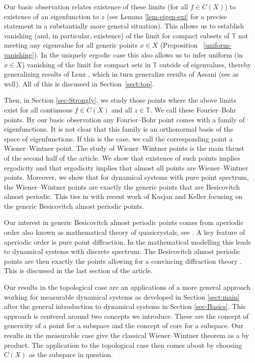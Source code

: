 \documentclass [14pt]{amsart}
\numberwithin{equation}{section}
\newcommand{\TT}{\mathbb T}
\begin{document}
Our basic observation relates existence of these limits (for all $f\in
C(X)$)  to existence of an eigenfunction to $z$ (see Lemma
\ref{lem-eigen-exi} for a precise statement in a substantially more
general situation). This allows us to establish vanishing (and, in
particular,  existence) of the limit for compact subsets of $\TT$ not
meeting any eigenvalue for all generic points $x\in X$ (Proposition~
\ref{uniform-vanishing}). In the uniquely ergodic case this  also
allows us to infer uniform (in $x\in X$) vanishing of the limit for
compact sets in $\TT$ outside of eigenvalues, thereby generalizing
results of Lenz \cite{Len}, which in turn generalize results of Assani
\cite{Ass} (see  \cite{Rob,Sch} as well). All of this is
discussed in Section~\ref{sect:top}.

Then, in Section \ref{sec-Strongly}, we study those points
where the above limits exist for all continuous $f \in C(X)$ and all $z\in
\TT$. We call these Fourier--Bohr points. By our basic observation any
Fourier--Bohr point comes with a family of eigenfunctions. It is not
clear that this family is an orthonormal basis of the space of
eigenfunctions. If this is the case, we call the corresponding point a
Wiener--Wintner point. The study of Wiener--Wintner points is the main
thrust of the second half of the article. We show that existence of
such points implies ergodicity and that ergodicity implies that almost
all points are Wiener--Wintner points. Moreover, we show that for dynamical systems with pure
point spectrum, the
Wiener--Wintner points are exactly the generic points that are Besicovitch almost
periodic. This ties in with recent work of Kasjan and Keller
\cite{KK} focusing on the generic Besicovitch almost periodic points.

Our interest in generic Besicovitch  almost periodic points comes from
aperiodic order also known as mathematical theory of quasicrystals,
see \cite{TAO}. A key feature of aperiodic order  is pure point
diffraction. In the mathematical modelling this leads to dynamical
systems with discrete spectrum. The Besicovitch almost periodic points
are then exactly the points allowing for a convincing diffraction
theory \cite{LSS,LSS2}. This is discussed in the last section of the article.


Our results in the topological case are an  applications of a more
general approach working for measurable dynamical systems as
developed in  Section \ref{sect:main} after the general introduction to
dynamical systems in Section \ref{sec-Basics}.  This approach is
centered around two concepts we introduce. These are the  concept of
genericity of a point for a subspace and the concept of core for a
subspace. Our results in the measurable case give the classical  Wiener--Wintner
theorem as a  by product. The application to the topological case then
comes about by choosing $C(X)$ as the subspace in question.
\end{document}

